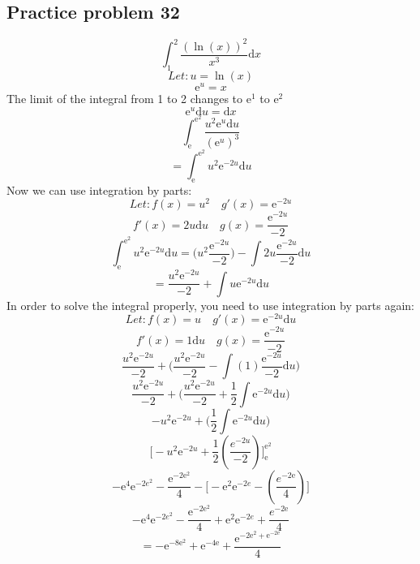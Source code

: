 \documentclass[letterpaper, 12pt]{article}
\newcommand*{\diff}{\mathrm{d}}
\newcommand*{\e}{\mathrm{e}}
\begin{document}
\subsection*{Practice problem 32}
\[ \int_{1}^{2}{\frac{(\ln(x))^2}{x^{3}}\diff{x}} \]
\[ Let: u = \ln(x) \]
\[ \e^{u} = x \]
The limit of the integral from 1 to 2 changes to \( \e^{1} \) to \( \e^{2} \)
\[ \e^{u}\diff{u} = \diff{x} \]
\[ \int_{\e}^{\e^{2}}{\frac{u^{2}\e^{u}\diff{u}}{(\e^{u})^{3}}} \]
\[ = \int_{\e}^{\e^{2}}{u^{2}\e^{-2u}\diff{u}} \]
Now we can use integration by parts:
\[ Let: f(x) = u^{2} \quad g'(x) = \e^{-2u} \]
\[ f'(x) = 2u\diff{u} \quad g(x) = \frac{\e^{-2u}}{-2} \]
\[ \int_{\e}^{\e^{2}}{u^{2}\e^{-2u}\diff{u}} =
   \bigg(u^{2}\frac{\e^{-2u}}{-2}\bigg)-\int{2u\frac{\e^{-2u}}{-2}\diff{u}} \]
\[ = \frac{u^{2}\e^{-2u}}{-2}+\int{u\e^{-2u}\diff{u}} \]
In order to solve the integral properly, you need to use integration by parts
again:
\[ Let: f(x) = u \quad g'(x) = \e^{-2u}\diff{u} \]
\[ f'(x) = 1\diff{u} \quad g(x) = \frac{\e^{-2u}}{-2} \]
\[ \frac{u^{2}\e^{-2u}}{-2}+
   \bigg(\frac{u^{2}\e^{-2u}}{-2}-\int{(1)\frac{\e^{-2u}}{-2}\diff{u}}\bigg) \]
\[ \frac{u^{2}\e^{-2u}}{-2}+
   \bigg(\frac{u^{2}\e^{-2u}}{-2}+\frac{1}{2}\int{\e^{-2u}\diff{u}}\bigg) \]
\[ -u^{2}\e^{-2u}+\bigg(\frac{1}{2}\int{\e^{-2u}\diff{u}}\bigg) \]
\[ \bigg[-u^{2}\e^{-2u}+\frac{1}{2}(\frac{e^{-2u}}{-2})\bigg]_{\e}^{\e^{2}} \]
\[ -\e^{4}\e^{-2e^{2}}-\frac{\e^{-2\e^{2}}}{4}-
   \bigg[-\e^{2}\e^{-2e}-(\frac{e^{-2\e}}{4})\bigg] \]
\[ -\e^{4}\e^{-2e^{2}}-\frac{\e^{-2\e^{2}}}{4}+
   \e^{2}\e^{-2e}+\frac{e^{-2\e}}{4} \]
\[ = -\e^{-8\e^{2}}+\e^{-4\e}+\frac{\e^{-2\e^{2}+\e^{-2\e}}}{4} \]
\end{document}
